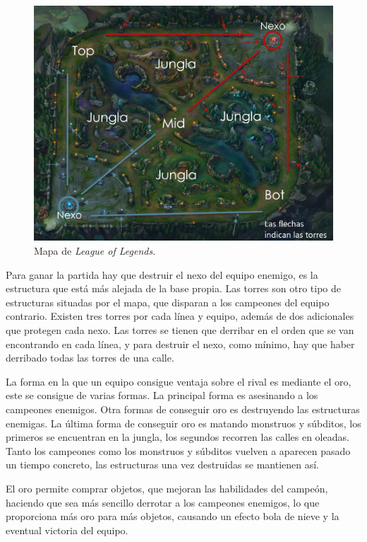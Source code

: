 \begin{figure}
	\centering
	\includegraphics[width=1\linewidth]{img/mapa-lol}
	\caption{Mapa de \textit{League of Legends}.}
	\label{fig:mapa-lol}
\end{figure}

Para ganar la partida hay que destruir el nexo del equipo enemigo, es la estructura que está más alejada de la base propia. Las torres son otro tipo de estructuras situadas por el mapa, que disparan a los campeones del equipo contrario. Existen tres torres por cada línea y equipo, además de dos adicionales que protegen cada nexo. Las torres se tienen que derribar en el orden que se van encontrando en cada línea, y para destruir el nexo, como mínimo, hay que haber derribado todas las torres de una calle.

La forma en la que un equipo consigue ventaja sobre el rival es mediante el oro, este se consigue de varias formas. La principal forma es asesinando a los campeones enemigos. Otra formas de conseguir oro es destruyendo las estructuras enemigas. La última forma de conseguir oro es matando monstruos y súbditos, los primeros se encuentran en la jungla, los segundos recorren las calles en oleadas. Tanto los campeones como los monstruos y súbditos vuelven a aparecen pasado un tiempo concreto, las estructuras una vez destruidas se mantienen así.

El oro permite comprar objetos, que mejoran las habilidades del campeón, haciendo que sea más sencillo derrotar a los campeones enemigos, lo que proporciona más oro para más objetos, causando un efecto bola de nieve y la eventual victoria del equipo.


